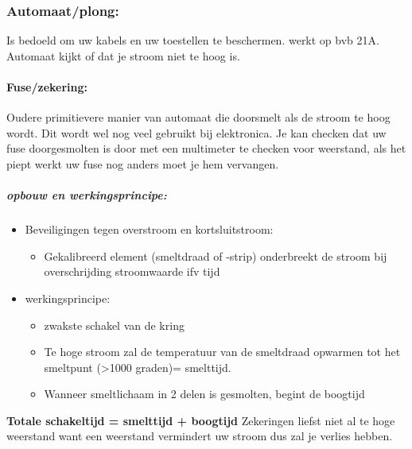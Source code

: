\documentclass[12pt]{article}
\begin{document}
\subsubsection{Automaat/plong:}
Is bedoeld om uw kabels en uw toestellen te beschermen. werkt op bvb 21A. Automaat kijkt of dat je stroom niet te hoog is.
\paragraph{Fuse/zekering:}
Oudere primitievere manier van automaat die doorsmelt als de stroom te hoog wordt. Dit wordt wel nog veel gebruikt bij elektronica. Je kan checken dat uw fuse doorgesmolten is door met een multimeter te checken voor weerstand, als het piept werkt uw fuse nog anders moet je hem vervangen.
\subparagraph{opbouw en werkingsprincipe:}
\begin{itemize}
    \item Beveiligingen tegen overstroom en kortsluitstroom:\begin{itemize}
        \item Gekalibreerd element (smeltdraad of -strip) onderbreekt de stroom bij overschrijding stroomwaarde ifv tijd
    \end{itemize}
    \item werkingsprincipe:\begin{itemize}
        \item zwakste schakel van de kring
        \item Te hoge stroom zal de temperatuur van de smeltdraad opwarmen tot het smeltpunt (>1000 graden)= smelttijd.
        \item Wanneer smeltlichaam in 2 delen is gesmolten, begint de boogtijd
    \end{itemize}
\end{itemize}
\textbf{Totale schakeltijd = smelttijd + boogtijd}
Zekeringen liefst niet al te hoge weerstand want een weerstand vermindert uw stroom dus zal je verlies hebben.
\end{document}
